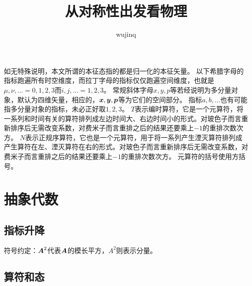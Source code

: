 \documentclass[hyperref, UTF8, a4paper]{ctexart}
\title{从对称性出发看物理}
\author{wujinq}
\begin{document}
\maketitle

\vspace{2em}


如无特殊说明，本文所谓的本征态指的都是归一化的本征矢量。
以下希腊字母的指标跑遍所有时空维度，而拉丁字母的指标仅仅跑遍空间维度，也就是$\mu, \nu, \ldots = 0, 1, 2, 3$而$i, j, \ldots = 1, 2, 3$。
常规斜体字母$x, y, p$等若经说明为多分量对象，默认为四维矢量，相应的，$\vb*{x}, \vb*{y}, \vb*{p}$等为它们的空间部分。
指标$a,b,\ldots$也有可能指多分量对象的指标，未必正好取$1, 2, 3$。
$T$表示编时算符，它是一个元算符，将一系列和时间有关的算符排列成左边时间大、右边时间小的形式。对玻色子而言重新排序后无需改变系数，对费米子而言重排之后的结果还要乘上$-1$的重排次数次方。
$N$表示正规序算符，它也是一个元算符，用于将一系列产生湮灭算符排列成产生算符在左、湮灭算符在右的形式。对玻色子而言重新排序后无需改变系数，对费米子而言重排之后的结果还要乘上$-1$的重排次数次方。
元算符的括号使用方括号。

\section{抽象代数}

\subsection{指标升降}

符号约定：$\vb*{A}^2$代表$\vb*{A}$的模长平方，$A^2$则表示分量。

\subsection{算符和态}
\end{document}
